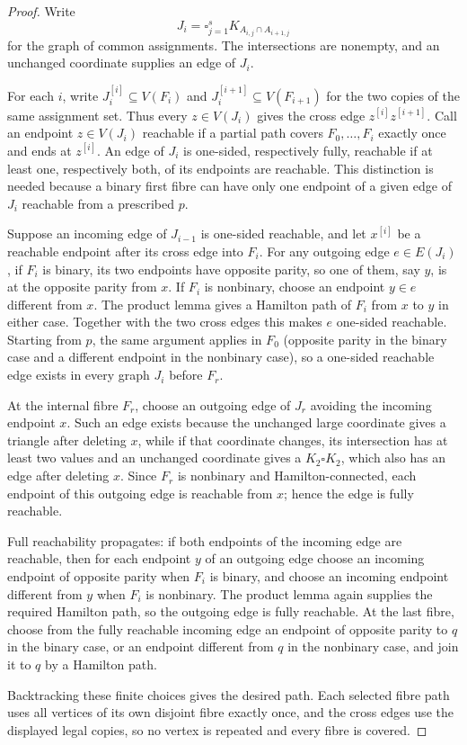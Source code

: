 \documentclass[11pt]{article}
\theoremstyle{remark}
\numberwithin{equation}{section}
\numberwithin{table}{section}
\begin{document}
\begin{proof}
Write
\[
 J_i=\square_{j=1}^s K_{A_{i,j}\cap A_{i+1,j}}
\]
for the graph of common assignments.  The intersections are nonempty,
and an unchanged coordinate supplies an edge of $J_i$.

For each $i$, write $J_i^{[i]}\subseteq V(F_i)$ and
$J_i^{[i+1]}\subseteq V(F_{i+1})$ for the two copies of the same
assignment set.  Thus every $z\in V(J_i)$ gives the cross edge
$z^{[i]}z^{[i+1]}$.  Call an endpoint $z\in V(J_i)$ reachable if a
partial path covers $F_0,\ldots,F_i$ exactly once and ends at
$z^{[i]}$.  An edge of $J_i$ is one-sided, respectively fully,
reachable if at least one, respectively both, of its endpoints are
reachable.  This distinction is needed because a binary first fibre
can have only one endpoint of a given edge of $J_i$ reachable from a
prescribed $p$.

Suppose an incoming edge of $J_{i-1}$ is one-sided reachable, and let
$x^{[i]}$ be a reachable endpoint after its cross edge into $F_i$.
For any outgoing edge $e\in E(J_i)$, if $F_i$ is binary, its two
endpoints have opposite parity, so one of them, say $y$, is at the
opposite parity from $x$.  If $F_i$ is nonbinary, choose an endpoint
$y\in e$ different from $x$.  The product lemma gives a Hamilton path
of $F_i$ from $x$ to $y$ in either case.  Together with the two cross
edges this makes $e$ one-sided reachable.  Starting from $p$, the same
argument applies in $F_0$ (opposite parity in the binary case and a
different endpoint in the nonbinary case), so a one-sided reachable
edge exists in every graph $J_i$ before $F_r$.

At the internal fibre $F_r$, choose an outgoing edge of $J_r$ avoiding
the incoming endpoint $x$.  Such an edge exists because the unchanged
large coordinate gives a triangle after deleting $x$, while if that
coordinate changes, its intersection has at least two values and an
unchanged coordinate gives a $K_2\square K_2$, which also has an edge
after deleting $x$.  Since $F_r$ is nonbinary and Hamilton-connected,
each endpoint of this outgoing edge is reachable from $x$; hence the
edge is fully reachable.

Full reachability propagates: if both endpoints of the incoming edge
are reachable, then for each endpoint $y$ of an outgoing edge choose an
incoming endpoint of opposite parity when $F_i$ is binary, and choose
an incoming endpoint different from $y$ when $F_i$ is nonbinary.  The
product lemma again supplies the required Hamilton path, so the outgoing
edge is fully reachable.  At the last fibre, choose from the fully
reachable incoming edge an endpoint of opposite parity to $q$ in the
binary case, or an endpoint different from $q$ in the nonbinary case,
and join it to $q$ by a Hamilton path.

Backtracking these finite choices gives the desired path.  Each selected
fibre path uses all vertices of its own disjoint fibre exactly once, and
the cross edges use the displayed legal copies, so no vertex is repeated
and every fibre is covered.
\end{proof}
\end{document}
